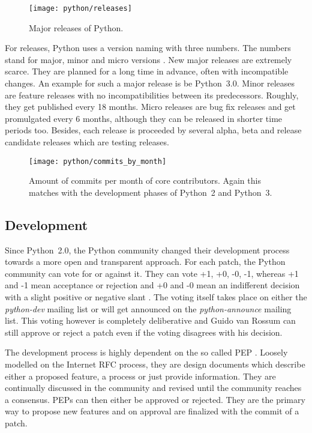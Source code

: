 \begin{figure}[htbp]
  \centering
  \texttt{[image: python/releases]}
  \caption[Major Releases of Python]{Major releases of Python.}
\end{figure}

For releases, Python uses a version naming with three numbers. The numbers
stand for major, minor and micro versions
\cite{PythonDevelopmentCycle,Warsaw2001}. New major releases are extremely
scarce. They are planned for a long time in advance, often with incompatible
changes. An example for such a major release is be Python~3.0. Minor releases
are feature releases with no incompatibilities between its predecessors.
Roughly, they get published every 18 months. Micro releases are bug fix releases
and get promulgated every 6 months, although they can be released in shorter
time periods too. Besides, each release is proceeded by several alpha, beta and
release candidate releases which are testing releases.

\begin{figure}[htbp]
  \centering
  \texttt{[image: python/commits\_by\_month]}
  \caption[Commits by Month, Python]
  {Amount of commits per month of core contributors. Again this matches with
    the development phases of Python~2 and Python~3.}
\end{figure}


\subsection{Development} %

Since Python~2.0, the Python community changed their development process
towards a more open and transparent approach. For each patch, the Python
community can vote for or against it. They can vote +1, +0, -0, -1, whereas +1
and -1 mean acceptance or rejection and +0 and -0 mean an indifferent decision
with a slight positive or negative slant \cite{Warsaw2002}. The voting itself
takes place on either the \emph{python-dev} mailing list or will get announced
on the \emph{python-announce} mailing list. This voting however is completely
deliberative and Guido van Rossum can still approve or reject a patch even if
the voting disagrees with his decision.

The development process is highly dependent on the so called \ac{PEP}
\cite{Warsaw2000}. Loosely modelled on the Internet \ac{RFC} process, they are
design documents which describe either a proposed feature, a process or just
provide information. They are continually discussed in the community and
revised until the community reaches a consensus. \acp{PEP} can then either be
approved or rejected. They are the primary way to propose new features and on
approval are finalized with the commit of a patch.

